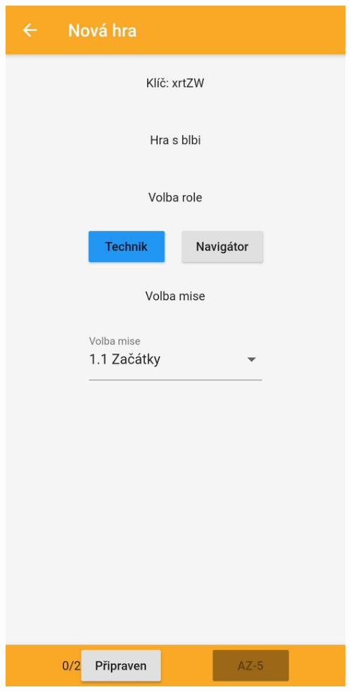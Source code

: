 \documentclass[czech,aspectratio=169]{beamer}
\begin{document}
  \begin{frame}
    \begin{columns}
      \begin{column}{.25\textwidth}
        \begin{center}
          \includegraphics[width=.9\textwidth]{assets/slides/screen-b1}
        \end{center}
      \end{column}
      \begin{column}{.25\textwidth}

\end{column}
\end{columns}
\end{frame}
\end{document}
